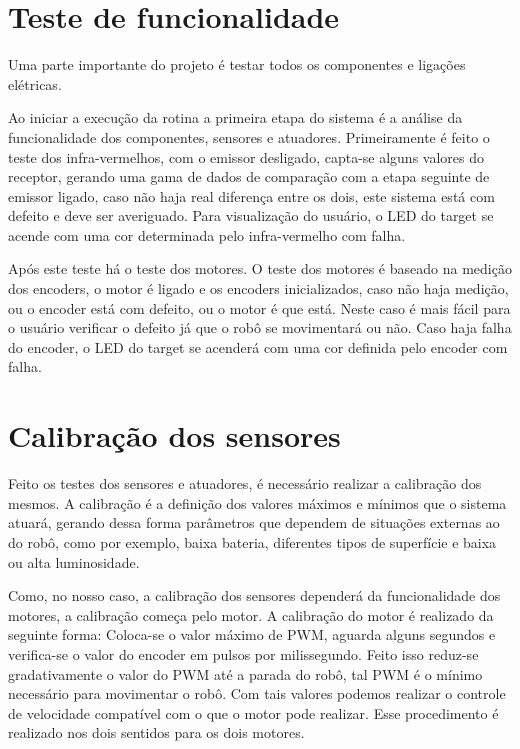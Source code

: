 \documentclass{article}
\begin{document}
\section{Teste de funcionalidade}

Uma parte importante do projeto é testar todos os componentes e ligações elétricas. 

Ao iniciar a execução da rotina a primeira etapa do sistema é a análise da funcionalidade dos componentes, sensores e atuadores. Primeiramente é feito o teste dos infra-vermelhos, com o emissor desligado, capta-se alguns valores do receptor, gerando uma gama de dados de comparação com a etapa seguinte de emissor ligado, caso não haja real diferença entre os dois, este sistema está com defeito e deve ser averiguado. Para visualização do usuário, o LED do {target} se acende com uma cor determinada pelo infra-vermelho com falha.

Após este teste há o teste dos motores. O teste dos motores é baseado na medição dos encoders, o motor é ligado e os encoders inicializados, caso não haja medição, ou o encoder está com defeito, ou o motor é que está. Neste caso é mais fácil para o usuário verificar o defeito já que o robô se movimentará ou não. Caso haja falha do encoder, o LED do {target} se acenderá com uma cor definida pelo encoder com falha.

 
\section{Calibração dos sensores}

Feito os testes dos sensores e atuadores, é necessário realizar a calibração dos mesmos. A calibração é a definição dos valores máximos e mínimos que o sistema atuará, gerando dessa forma parâmetros que dependem de situações externas ao do robô, como por exemplo, baixa bateria, diferentes tipos de superfície e baixa ou alta luminosidade.

Como, no nosso caso, a calibração dos sensores dependerá  da funcionalidade dos motores, a calibração começa pelo motor. A calibração do motor é realizado da seguinte forma: Coloca-se o valor máximo de PWM, aguarda alguns segundos e verifica-se o valor do encoder em pulsos por milissegundo. Feito isso reduz-se gradativamente o valor do PWM até a parada do robô, tal PWM é o mínimo necessário para movimentar o robô. Com tais valores podemos realizar o controle de velocidade compatível com o que o motor pode realizar. Esse procedimento é realizado nos dois sentidos para os dois motores.
\end{document}
